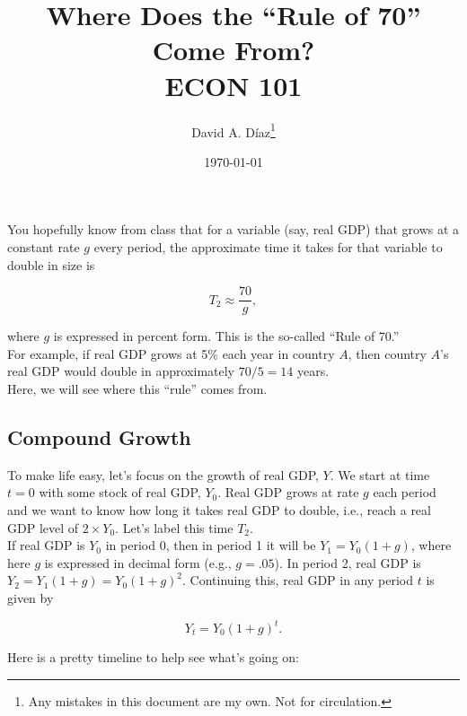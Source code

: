 \documentclass[11pt]{article}\usepackage[]{graphicx}\usepackage[]{color}
\begin{document}
	
\title{\textbf{Where Does the ``Rule of 70'' Come From?} \\ \vspace{2 mm} {\large ECON 101}}
\author{David A. D\'iaz\footnote{Any mistakes in this document are my own. Not for circulation.}}
\date{\today}
\maketitle

You hopefully know from class that for a variable (say, real GDP) that grows at a constant rate $g$ every period, the approximate time it takes for that variable to double in size is 

\begin{equation}
\label{eq1}
T_2 \approx \frac{70}{g},
\end{equation}

where $g$ is expressed in percent form. This is the so-called ``Rule of 70.'' 
\\

For example, if real GDP grows at 5\% each year in country $A$, then country $A$'s real GDP would double in approximately $70/5 = 14$ years.
\\

Here, we will see where this ``rule'' comes from.

\subsection*{Compound Growth}

To make life easy, let's focus on the growth of real GDP, $Y$. We start at time $t=0$ with some stock of real GDP, $Y_0$. Real GDP grows at rate $g$ each period and we want to know how long it takes real GDP to double, i.e., reach a real GDP level of $2\times Y_0$. Let's label this time $T_2$.
\\

If real GDP is $Y_0$ in period 0, then in period 1 it will be $Y_1 = Y_0(1+g)$, where here $g$ is expressed in decimal form (e.g., $g=.05$). In period 2, real GDP is $Y_2 = Y_1(1+g) = Y_0(1+g)^2$. Continuing this, real GDP in any period $t$ is given by 

\begin{equation}
\label{eq2}
Y_t = Y_0(1+g)^t. 
\end{equation}

Here is a pretty timeline to help see what's going on:
\\
\end{document}
